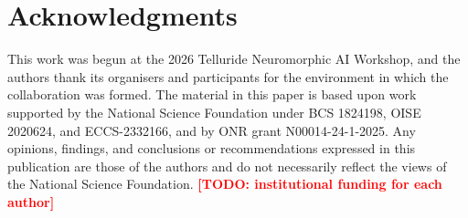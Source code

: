 \documentclass[conference]{IEEEtran}
\newcommand{\todo}[1]{\textcolor{red}{\textbf{[TODO: #1]}}}
\begin{document}
\section*{Acknowledgments}
This work was begun at the 2026 Telluride Neuromorphic AI Workshop, and
the authors thank its organisers and participants for the environment in
which the collaboration was formed. The material in this paper is based
upon work supported by the National Science Foundation under BCS 1824198,
OISE 2020624, and ECCS-2332166, and by ONR grant N00014-24-1-2025. Any
opinions, findings, and conclusions or recommendations expressed in this
publication are those of the authors and do not necessarily reflect the
views of the National Science Foundation.
\todo{institutional funding for each author}



\end{document}
